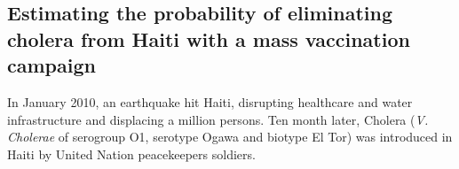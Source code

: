 \begin{fullwidth}
\chapter[Spatial stochatic model for modeling cholera elimination]{Estimating the probability of eliminating cholera from Haiti with a mass vaccination campaign}%
\label{ch:cholera-haiti-ocv}
\end{fullwidth}
In January 2010, an earthquake hit Haiti, disrupting healthcare and water infrastructure and displacing a million persons. Ten month later, Cholera (\textit{V. Cholerae} of serogroup O1, serotype Ogawa and biotype El Tor) was introduced in Haiti by United Nation peacekeepers soldiers\cite[-3\baselineskip]{Frerichs:NepaleseOriginCholera:2012, Piarroux:UnderstandingCholeraEpidemic:2011}. 
